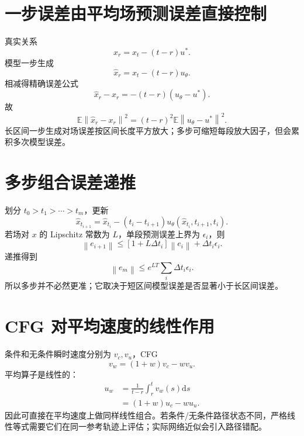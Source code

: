 \documentclass[UTF8,12pt,a4paper,fontset=none]{ctexart}
\numberwithin{equation}{section}
\newcommand{\E}{\mathbb{E}}
\newcommand{\norm}[1]{\left\lVert #1\right\rVert}
\newcommand{\dd}{\mathrm{d}}
\begin{document}
\section{一步误差由平均场预测误差直接控制}
真实关系
\begin{equation}
 x_r=x_t-(t-r)u^*.
\end{equation}
模型一步生成
\begin{equation}
 \widehat x_r=x_t-(t-r)u_\theta.
\end{equation}
相减得精确误差公式
\begin{equation}
 \boxed{
 \widehat x_r-x_r=-(t-r)(u_\theta-u^*).
 }
\end{equation}
故
\begin{equation}
 \E\norm{\widehat x_r-x_r}^2
 =(t-r)^2\E\norm{u_\theta-u^*}^2.
\end{equation}
长区间一步生成对场误差按区间长度平方放大；多步可缩短每段放大因子，但会累积多次模型误差。

\section{多步组合误差递推}
划分 $t_0>t_1>\cdots>t_m$，更新
\begin{equation}
 \widehat x_{t_{i+1}}
 =\widehat x_{t_i}-(t_i-t_{i+1})u_\theta(\widehat x_{t_i},t_{i+1},t_i).
\end{equation}
若场对 $x$ 的 Lipschitz 常数为 $L$，单段预测误差上界为 $\epsilon_i$，则
\begin{equation}
 \norm{e_{i+1}}
 \le[1+L\Delta t_i]\norm{e_i}+\Delta t_i\epsilon_i.
\end{equation}
递推得到
\begin{equation}
 \norm{e_m}
 \le e^{LT}\sum_i\Delta t_i\epsilon_i.
\end{equation}
所以多步并不必然更准；它取决于短区间模型误差是否显著小于长区间误差。

\section{CFG 对平均速度的线性作用}
条件和无条件瞬时速度分别为 $v_c,v_u$，CFG
\begin{equation}
 v_w=(1+w)v_c-wv_u.
\end{equation}
平均算子是线性的：
\begin{align}
 u_w
 &=\frac1{t-r}\int_r^tv_w(s)\dd s\\
 &=(1+w)u_c-wu_u.
\end{align}
因此可直接在平均速度上做同样线性组合。若条件/无条件路径状态不同，严格线性等式需要它们在同一参考轨迹上评估；实际网络近似会引入路径错配。
\end{document}
